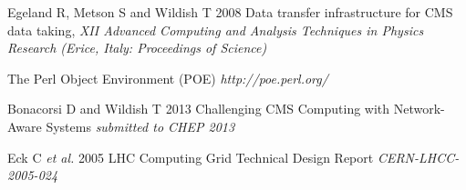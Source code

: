\begin{thebibliography}{1}
 Egeland R, Metson S and Wildish T 2008 Data transfer infrastructure for CMS data taking,  {\it XII Advanced Computing and Analysis Techniques in Physics Research (Erice, Italy: Proceedings of Science)}
 
 The Perl Object Environment (POE) {\it http://poe.perl.org/}

 Bonacorsi D and Wildish T 2013 Challenging CMS Computing with Network-Aware Systems {\it submitted to CHEP 2013}
 
 Eck C {\it et al.} 2005 LHC Computing Grid Technical Design Report {\it CERN-LHCC-2005-024}
 
\end{thebibliography}
